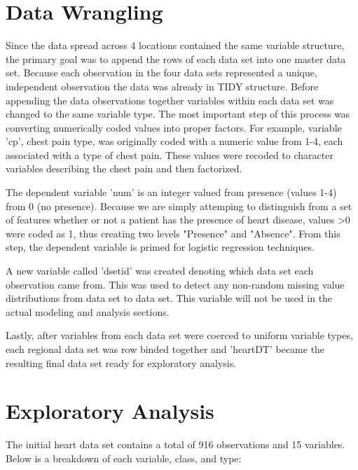 \documentclass[12pt]{article}
\begin{document}
\section{Data Wrangling}

Since the data spread across 4 locations contained the same variable structure, the primary goal was to append the rows of each data set into one master data set. Because each observation in the four data sets represented a unique, independent observation the data was already in TIDY structure. Before appending the data observations together variables within each data set was changed to the same variable type. The most important step of this process was converting numerically coded values into proper factors. For example, variable 'cp', chest pain type, was originally coded with a numeric value from 1-4, each associated with a type of chest pain. These values were recoded to character variables describing the chest pain and then factorized. 

The dependent variable 'num' is an integer valued from presence (values 1-4) from 0 (no presence). Because we are simply attemping to distinguish from a set of features whether or not a patient has the presence of heart disease, values \textgreater 0 were coded as 1, thus creating two levels "Presence" and "Absence". From this step, the dependent variable is primed for logistic regression techniques. 

A new variable called 'dsetid' was created denoting which data set each observation came from. This was used to detect any non-random missing value distributions from data set to data set. This variable will not be used in the actual modeling and analysis sections.

Lastly, after variables from each data set were coerced to uniform variable types, each regional data set was row binded together and 'heartDT' became the resulting final data set ready for exploratory analysis.


\section{Exploratory Analysis}
The initial heart data set contains a total of 916 observations and 15 variables. Below is a breakdown of each variable, class, and type: 
\end{document}
